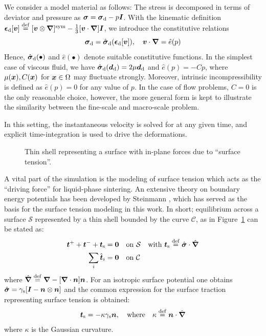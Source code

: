 \documentclass[MikaelDissertation.tex]{subfiles}
\begin{document}
We consider a model material as follows: The stress is decomposed in terms of deviator and pressure as $\boldsymbol{\sigma} = \boldsymbol{\sigma}_{\mathrm{d}} - p\boldsymbol{I}$.
With the kinematic definition $\boldsymbol{\epsilon}_{\mathrm{d}}[\boldsymbol{v}]\overset{\mathrm{def}}{=}[\boldsymbol{v}\mathbin{\otimes}\boldsymbol{\nabla}]^{\mathrm{sym}}-\frac{1}{3}[\boldsymbol{v}\cdot\boldsymbol{\nabla}]\boldsymbol{I}$, we introduce the constitutive relations
\begin{equation}
    \boldsymbol{\sigma}_{\mathrm{d}} = \hat{\boldsymbol{\sigma}}_{\mathrm{d}}(\boldsymbol{\epsilon}_{\mathrm{d}}[\boldsymbol{v}]), \quad
    \boldsymbol{v}\cdot\boldsymbol{\nabla} = \hat{e}(p)
\label{eq201}
\end{equation}
Hence, $\hat{\boldsymbol{\sigma}}_{\mathrm{d}}(\bullet)$ and $\hat{e}(\bullet)$ denote suitable constitutive functions.
In the simplest case of viscous fluid, we have $\hat{\boldsymbol{\sigma}}_{\mathrm{d}}(\boldsymbol{d}_{\mathrm{d}})=2\mu\boldsymbol{d}_{\mathrm{d}}$ and $\hat{e}(p)=- C p$, where $\mu(\boldsymbol{x}), C(\boldsymbol{x})$ for $\boldsymbol{x}\in\Omega$ may fluctuate strongly.
Moreover, intrinsic incompressibility is defined as $\hat{e}(p)=0$ for any value of $p$.
In the case of flow problems, $C = 0$ is the only reasonable choice, however, the more general form is kept to illustrate the similarity between the fine-scale and macro-scale problem.

In this setting, the instantaneous velocity is solved for at any given time, and explicit time-integration is used to drive the deformations.

\begin{figure}[th!]
    \centering
    
    \caption{Thin shell representing a surface with in-plane forces due to ``surface tension''.}
    \label{fig:surfacestress}
\end{figure}
A vital part of the simulation is the modeling of surface tension which acts as the ``driving force'' for liquid-phase sintering.
An extensive theory on boundary energy potentials has been developed by Steinmann \cite{steinmann_boundary_2008}, which has served as the basis for the surface tension modeling in this work.
In short; equilibrium across a surface $\mathcal{S}$ represented by a thin shell bounded by the curve $\mathcal{C}$, as in Figure~\ref{fig:surfacestress} can be stated as:
\begin{align}
    \boldsymbol{t}^+ + \boldsymbol{t}^- + \boldsymbol{t}_{\mathrm{s}} &= \boldsymbol{0} \quad \text{on} \,\, \mathcal{S} \quad \text{with } \boldsymbol{t}_{\mathrm{s}} \overset{\mathrm{def}}{=} \hat{\boldsymbol{\sigma}}\cdot\hat{\boldsymbol{\nabla}}
\label{eq103KR}\\
    \sum_i \hat{\boldsymbol{t}}_i &= \boldsymbol{0} \quad \text{on} \,\, \mathcal{C}
\label{eq104KR}
\end{align}
where $\hat{\boldsymbol{\nabla}} \overset{\mathrm{def}}{=} \boldsymbol{\nabla} - [\boldsymbol{\nabla}\cdot\boldsymbol{n}]\boldsymbol{n}$.
For an isotropic surface potential one obtains $\hat{\boldsymbol{\sigma}} = \gamma_{\mathrm{s}}[\boldsymbol{I}-\boldsymbol{n}\mathbin{\otimes}\boldsymbol{n}]$ and the common expression for the surface traction representing surface tension is obtained:
\begin{align}
 \boldsymbol{t}_{\mathrm{s}} = -\kappa \gamma_{\mathrm{s}} \boldsymbol{n},\quad \text{where}\quad \kappa \overset{\mathrm{def}}{=} \boldsymbol{n}\cdot\hat{\boldsymbol{\nabla}}
\end{align}
where $\kappa$ is the Gaussian curvature.
\end{document}

